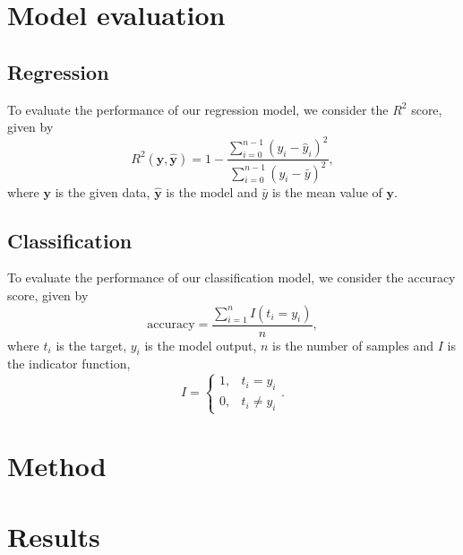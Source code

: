 \documentclass[a4paper, 11pt, twocolumn]{article}
\begin{document}
\section{Model evaluation}
\subsection{Regression}
To evaluate the performance of our regression model, we consider the $R^2$ score, given by
\begin{equation}
    R^2(\bm{y}, \bm{\hat{y}}) = 1 - \frac{\sum_{i=0}^{n - 1} (y_i - \hat{y}_i)^2}{\sum_{i=0}^{n - 1} (y_i - \bar{y})^2},
    \label{eq:R2}
\end{equation}
where $\bm{y}$ is the given data, $\bm{\hat{y}}$ is the model and ${\bar{y}}$ is the mean value of $\bm{y}$.
\subsection{Classification}
To evaluate the performance of our classification model, we consider the accuracy score, given by
\begin{equation}
\label{eq:accuracy}
\text{accuracy}=\frac{\sum_{i=1}^nI(t_i=y_i)}{n},
\end{equation}
where $t_i$ is the target, $y_i$ is the model output, $n$ is the number of samples and $I$ is the indicator function,
\[
I = \begin{cases}
1, & t_i = y_i\\
0, & t_i \neq y_i
\end{cases} .
\]

\section{Method}




\section{Results}
\end{document}
